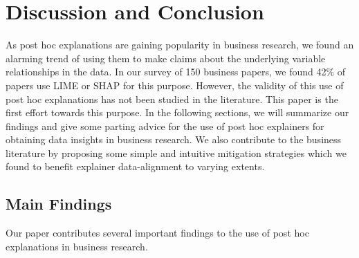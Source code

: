 \documentclass[mnsc,blindrev]{informs3}
\begin{document}
\section{Discussion and Conclusion}
    \label{sec:discussion}
    As post hoc explanations are gaining popularity in business research, we found an alarming trend of using them to make claims about the underlying variable relationships in the data. In our survey of 150 business papers, we found 42\% of papers use LIME or SHAP for this purpose. However, the validity of this use of post hoc explanations has not been studied in the literature. 
    This paper is the first effort towards this purpose. 
     In the following sections, we will summarize our findings and give some parting advice for the use of post hoc explainers for obtaining data insights in business research. 
    We also contribute to the business literature by proposing some simple and intuitive mitigation strategies which we found to benefit explainer data-alignment to varying extents.


    \subsection{Main Findings}
        Our paper contributes several important findings to the use of post hoc explanations in business research.
\end{document}
